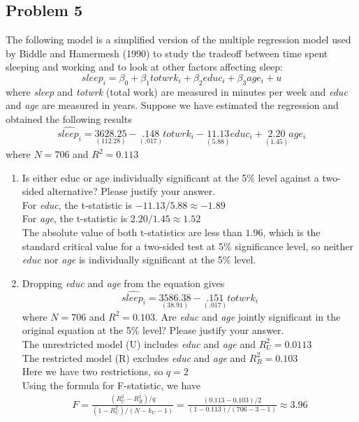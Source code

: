 \documentclass[12pt]{article}
\begin{document}
\begin{flushleft}
\subsection*{Problem 5}
The following model is a simplified version of the multiple regression model used by Biddle
and Hamermesh (1990) to study the tradeoff between time spent sleeping and working and
to look at other factors affecting sleep:
\[
sleep_i=\beta_0+\beta_1totwrk_i+\beta_2educ_i+\beta_3age_i+u
\]
where \textit{sleep} and \textit{totwrk} (total work) are measured in minutes per week and \textit{educ} and \textit{age} are measured in years. Suppose we have estimated the regression and obtained the following results
\[
\hat{sleep_i}=\underset{(112.28)}{3628.25}-\underset{(.017)}{.148}totwrk_i-\underset{(5.88)}{11.13}educ_i+\underset{(1.45)}{2.20}age_i
\]
where $N=706$ and $R^2=0.113$
\begin{enumerate}
    \item Is either educ or age individually significant at the 5\% level against a two-sided alternative? Please justify your answer.\\
    For \textit{educ}, the t-statistic is $-11.13/5.88 \approx -1.89$ \\ 
    For \textit{age}, the t-statistic is $2.20/1.45 \approx 1.52$\\
    The absolute value of both t-statistics are less than $1.96$, which is the standard critical value for a two-sided test at 5\% significance level, so neither \textit{educ} nor \textit{age} is individually significant at the 5\% level.
    \item Dropping \textit{educ} and \textit{age} from the equation gives
    \[
    \hat{sleep_i}=\underset{(38.91)}{3586.38}-\underset{(.017)}{.151}totwrk_i
    \]
    where $N=706$ and $R^2=0.103$. Are \textit{educ} and \textit{age} jointly significant in the original equation at the 5\% level? Please justify your answer.\\
    The unrestricted model (U) includes \textit{educ} and \textit{age} and $R_U^2=0.0113$\\
    The restricted model (R) excludes \textit{educ} and \textit{age} and $R_R^2=0.103$\\
    Here we have two restrictions, so $q=2$\\
    Using the formula for F-statistic, we have
    \begin{align*}
        F=\frac{(R_U^2-R_R^2)/q}{(1-R_U^2)/(N-k_U-1)}=\frac{(0.113-0.103)/2}{(1-0.113)/(706-3-1)}\approx 3.96
    \end{align*}

\end{enumerate}
\end{flushleft}
\end{document}
